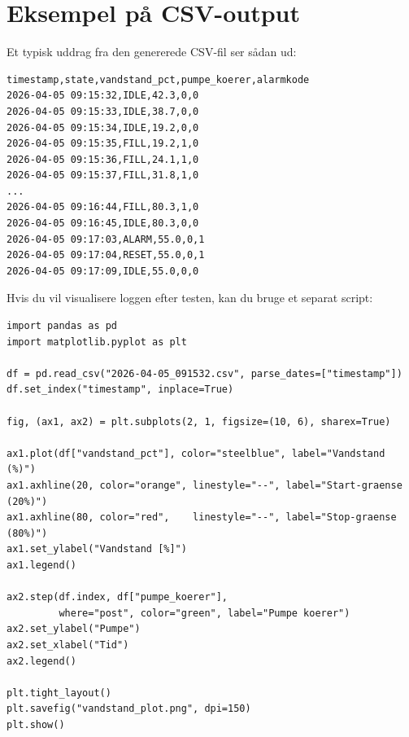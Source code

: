 \documentclass[12pt, a4paper]{article}
\begin{document}
\section{Eksempel på CSV-output}\label{sec:csv}

Et typisk uddrag fra den genererede CSV-fil ser sådan ud:

\begin{tcolorbox}[codebox, title={\faFile\quad \texttt{2026{-}04{-}05\_091532.csv}}]
\begin{lstlisting}[style=python]
timestamp,state,vandstand_pct,pumpe_koerer,alarmkode
2026-04-05 09:15:32,IDLE,42.3,0,0
2026-04-05 09:15:33,IDLE,38.7,0,0
2026-04-05 09:15:34,IDLE,19.2,0,0
2026-04-05 09:15:35,FILL,19.2,1,0
2026-04-05 09:15:36,FILL,24.1,1,0
2026-04-05 09:15:37,FILL,31.8,1,0
...
2026-04-05 09:16:44,FILL,80.3,1,0
2026-04-05 09:16:45,IDLE,80.3,0,0
2026-04-05 09:17:03,ALARM,55.0,0,1
2026-04-05 09:17:04,RESET,55.0,0,1
2026-04-05 09:17:09,IDLE,55.0,0,0
\end{lstlisting}
\end{tcolorbox}

Hvis du vil visualisere loggen efter testen, kan du bruge et separat script:

\begin{tcolorbox}[codebox, title={\faChartLine\quad \texttt{plot\_vandstand.py}}]
\begin{lstlisting}[style=python]
import pandas as pd
import matplotlib.pyplot as plt

df = pd.read_csv("2026-04-05_091532.csv", parse_dates=["timestamp"])
df.set_index("timestamp", inplace=True)

fig, (ax1, ax2) = plt.subplots(2, 1, figsize=(10, 6), sharex=True)

ax1.plot(df["vandstand_pct"], color="steelblue", label="Vandstand (%)")
ax1.axhline(20, color="orange", linestyle="--", label="Start-graense (20%)")
ax1.axhline(80, color="red",    linestyle="--", label="Stop-graense (80%)")
ax1.set_ylabel("Vandstand [%]")
ax1.legend()

ax2.step(df.index, df["pumpe_koerer"],
         where="post", color="green", label="Pumpe koerer")
ax2.set_ylabel("Pumpe")
ax2.set_xlabel("Tid")
ax2.legend()

plt.tight_layout()
plt.savefig("vandstand_plot.png", dpi=150)
plt.show()
\end{lstlisting}
\end{tcolorbox}
\clearpage
\end{document}
